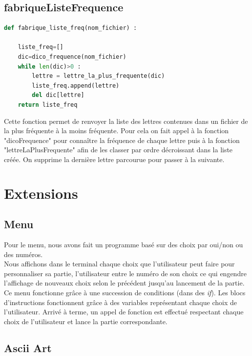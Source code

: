 \documentclass[french,10pt,a4paper]{article}	%
\begin{document}
	
	\subsection{fabriqueListeFrequence}
	
	\begin{lstlisting}[language=Python, frame=single]
def fabrique_liste_freq(nom_fichier) :

	liste_freq=[]
	dic=dico_frequence(nom_fichier)								 
	while len(dic)>0 :
		lettre = lettre_la_plus_frequente(dic)					
		liste_freq.append(lettre)
		del dic[lettre]											
	return liste_freq
	\end{lstlisting}
	
	Cette fonction permet de renvoyer la liste des lettres contenues dans un fichier de la plus fréquente à la moins fréquente. Pour cela on fait appel à la fonction "dicoFrequence" pour connaître la fréquence de chaque lettre puis à la fonction "lettreLaPlusFrequente" afin de les classer par ordre décroissant dans la liste créée. On supprime la dernière lettre parcourue pour passer à la suivante.
	
\section{Extensions}


	\subsection{Menu}
	
	
	Pour le menu, nous avons fait un programme basé sur des choix par oui/non ou des numéros. \\
	Nous affichons dans le terminal chaque choix que l'utilisateur peut faire pour personnaliser sa partie, l'utilisateur entre le numéro de son choix ce qui engendre l'affichage de nouveaux choix selon le précédent jusqu'au lancement de la partie. \\
	Ce menu fonctionne grâce à une succession de conditions (dans des \textit{if}). Les blocs d'instructions fonctionnent grâce à des variables représentant chaque choix de l'utilisateur. Arrivé à terme, un appel de fonction est effectué respectant chaque choix de l'utilisateur et lance la partie correspondante.
	
	
	\subsection{Ascii Art}
	
\end{document}
